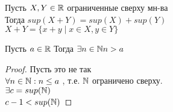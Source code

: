 \begin{theorem}
	Пусть $ X, Y \in \mathbb{R} $ ограниченные сверху мн-ва\\
	Тогда $sup(X+Y) = sup(X) + sup(Y)$ \\
	$ X + Y = \{ x + y \mid x \in X, y \in Y \} $
	\begin{consequence}
		Пусть $ a \in \mathbb{R} $  Тогда  $\exists n \in \mathbb{N} n > a $ 
		\begin{proof}
			Пусть это не так \\
			$ \forall n \in \mathbb{N} : n \leq a $ , т.е. $ \mathbb{N} $ ограничено сверху. \\
			$ \exists c = sup(\mathbb{N}) $ \\
			$ c - 1 < sup (\mathbb{N}) $ 
		\end{proof}
	\end{consequence}
\end{theorem}









